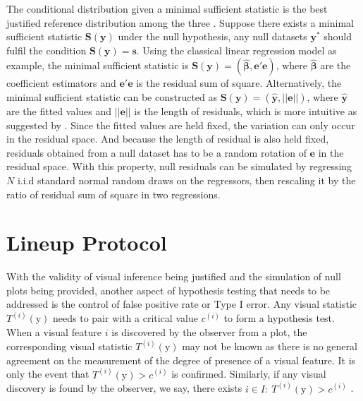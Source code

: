 \documentclass{monashthesis}
\theoremstyle{definition}
\theoremstyle{definition}
\theoremstyle{definition}
\theoremstyle{definition}
\theoremstyle{remark}
\begin{document}
The conditional distribution given a minimal sufficient statistic is the best justified reference distribution among the three \autocite{buja_statistical_2009}. Suppose there exists a minimal sufficient statistic \(\boldsymbol{S}(\boldsymbol{y})\) under the null hypothesis, any null datasets \(\boldsymbol{y^{*}}\) should fulfil the condition \(\boldsymbol{S}(\boldsymbol{y}) = \boldsymbol{s}\). Using the classical linear regression model as example, the minimal sufficient statistic is \(\boldsymbol{S}(\boldsymbol{y}) = (\hat{\boldsymbol{\beta}}, \boldsymbol{e}'\boldsymbol{e})\), where \(\hat{\boldsymbol{\beta}}\) are the coefficient estimators and \(\boldsymbol{e}'\boldsymbol{e}\) is the residual sum of square. Alternatively, the minimal sufficient statistic can be constructed as \(\boldsymbol{S}(\boldsymbol{y}) = (\hat{\boldsymbol{y}}, ||\boldsymbol{e}||)\), where \(\hat{\boldsymbol{y}}\) are the fitted values and \(||\boldsymbol{e}||\) is the length of residuals, which is more intuitive as suggested by \textcite{buja_statistical_2009}. Since the fitted values are held fixed, the variation can only occur in the residual space. And because the length of residual is also held fixed, residuals obtained from a null dataset has to be a random rotation of \(\boldsymbol{e}\) in the residual space. With this property, null residuals can be simulated by regressing \(N\) i.i.d standard normal random draws on the regressors, then rescaling it by the ratio of residual sum of square in two regressions.

\hypertarget{se:lineup}{%
\section{Lineup Protocol}\label{se:lineup}}

With the validity of visual inference being justified and the simulation of null plots being provided, another aspect of hypothesis testing that needs to be addressed is the control of false positive rate or Type I error. Any visual statistic \(T^{(i)}(\boldsymbol{\mathrm{y}})\) needs to pair with a critical value \(c^{(i)}\) to form a hypothesis test. When a visual feature \(i\) is discovered by the observer from a plot, the corresponding visual statistic \(T^{(i)}(\boldsymbol{\mathrm{y}})\) may not be known as there is no general agreement on the measurement of the degree of presence of a visual feature. It is only the event that \(T^{(i)}(\boldsymbol{\mathrm{y}}) > c^{(i)}\) is confirmed. Similarly, if any visual discovery is found by the observer, we say, there exists \(i \in I:~T^{(i)}(\boldsymbol{\mathrm{y}}) > c^{(i)}\) \autocite{buja_statistical_2009}.
\end{document}
